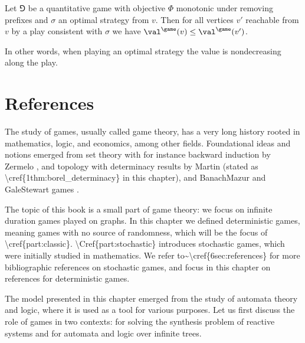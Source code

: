\documentclass[letterpaper,10pt,english]{sphinxmanual}
\begin{document}
Let \(\Game\) be a quantitative game with objective \(\Phi\) monotonic under
removing prefixes and \(\sigma\) an optimal strategy from \(v\). Then for
all vertices \(v'\) reachable from \(v\) by a play consistent with \(\sigma\)
we have \(\val^{\game}(v) \le \val^{\game}(v')\).

In other words, when playing an optimal strategy the value is
non\sphinxhyphen{}decreasing along the play.


\section{References}
\label{\detokenize{1_Introduction/references:references}}\label{\detokenize{1_Introduction/references:chap-references}}\label{\detokenize{1_Introduction/references::doc}}
The study of games, usually called game theory, has a very long history rooted in mathematics, logic, and economics, among other fields.
Foundational ideas and notions emerged from set theory with for instance backward induction by Zermelo ,
and topology with determinacy results by Martin  (stated as \textbackslash{}cref\{1\sphinxhyphen{}thm:borel\_determinacy\} in this chapter),
and Banach\sphinxhyphen{}Mazur and Gale\sphinxhyphen{}Stewart games .

The topic of this book is a small part of game theory: we focus on infinite duration games played on graphs.
In this chapter we defined deterministic games, meaning games with no source of randomness, which will be the focus of \textbackslash{}cref\{part:classic\}.
\textbackslash{}Cref\{part:stochastic\} introduces stochastic games, which were initially studied in mathematics.
We refer to\textasciitilde{}\textbackslash{}cref\{6\sphinxhyphen{}sec:references\} for more bibliographic references on stochastic games,
and focus in this chapter on references for deterministic games.

The model presented in this chapter emerged from the study of automata theory and logic, where it is used as a tool for various purposes.
Let us first discuss the role of games in two contexts:
for solving the synthesis problem of reactive systems and for automata and logic over infinite trees.
\end{document}
